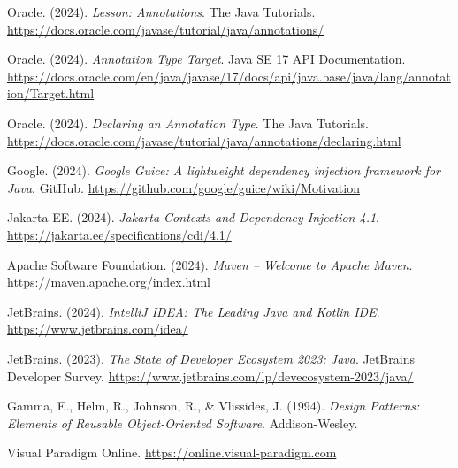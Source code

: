 \documentclass[12pt,a4paper]{report}
\begin{document}
\begin{thebibliography}{}
    Oracle. (2024).
    \textit{Lesson: Annotations}.
    The Java\texttrademark{} Tutorials.
    \url{https://docs.oracle.com/javase/tutorial/java/annotations/}

    Oracle. (2024).
    \textit{Annotation Type Target}.
    Java SE 17 API Documentation.
    \url{https://docs.oracle.com/en/java/javase/17/docs/api/java.base/java/lang/annotation/Target.html}

    Oracle. (2024).
    \textit{Declaring an Annotation Type}.
    The Java\texttrademark{} Tutorials.
    \url{https://docs.oracle.com/javase/tutorial/java/annotations/declaring.html}

    Google. (2024).
    \textit{Google Guice: A lightweight dependency injection
    framework for Java}. GitHub.
    \url{https://github.com/google/guice/wiki/Motivation}

    Jakarta EE. (2024).
    \textit{Jakarta Contexts and Dependency Injection 4.1}.
    \url{https://jakarta.ee/specifications/cdi/4.1/}

    Apache Software Foundation. (2024).
    \textit{Maven -- Welcome to Apache Maven}.
    \url{https://maven.apache.org/index.html}

    JetBrains. (2024).
    \textit{IntelliJ IDEA: The Leading Java and Kotlin IDE}.
    \url{https://www.jetbrains.com/idea/}

    JetBrains. (2023).
    \textit{The State of Developer Ecosystem 2023: Java}.
    JetBrains Developer Survey.
    \url{https://www.jetbrains.com/lp/devecosystem-2023/java/}

    Gamma, E., Helm, R., Johnson, R., \& Vlissides, J. (1994).
    \textit{Design Patterns: Elements of Reusable
    Object-Oriented Software}. Addison-Wesley.

    Visual Paradigm Online.
    \url{https://online.visual-paradigm.com}

\end{thebibliography}


\end{document}
